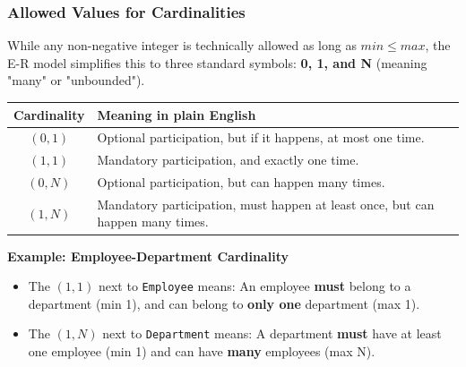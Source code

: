 \subsubsection{Allowed Values for Cardinalities}
While any non-negative integer is technically allowed as long as $min \leq max$, the E-R model simplifies this to three standard symbols: \textbf{0, 1, and N} (meaning "many" or "unbounded").

\begin{center}
\begin{tabular}{|c|l|}
\hline
\textbf{Cardinality} & \textbf{Meaning in plain English} \\
\hline
$(0,1)$ & Optional participation, but if it happens, at most one time. \\
$(1,1)$ & Mandatory participation, and exactly one time. \\
$(0,N)$ & Optional participation, but can happen many times. \\
$(1,N)$ & Mandatory participation, must happen at least once, but can happen many times. \\
\hline
\end{tabular}
\end{center}

\vspace{0.2cm}
\begin{example}{\textbf{Example: Employee-Department Cardinality}}

    \vs

\begin{itemize}
    \item The $(1,1)$ next to \texttt{Employee} means: An employee \textbf{must} belong to a department (min 1), and can belong to \textbf{only one} department (max 1).
    \item The $(1,N)$ next to \texttt{Department} means: A department \textbf{must} have at least one employee (min 1) and can have \textbf{many} employees (max N).
\end{itemize}

\vs
\begin{center}
\end{center}

\end{example}

